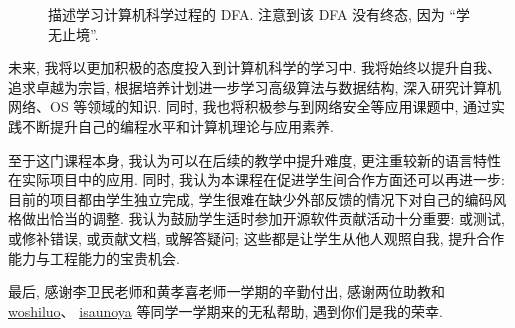 \begin{figure}[H]
    \centering
{}
\caption{描述学习计算机科学过程的 DFA. 注意到该 DFA 没有终态, 因为 “学无止境”.}
\label{fig_learning_process}
\end{figure}

未来, 我将以更加积极的态度投入到计算机科学的学习中. 我将始终以提升自我、 追求卓越为宗旨, 根据培养计划进一步学习高级算法与数据结构, 深入研究计算机网络、OS 等领域的知识. 同时, 我也将积极参与到网络安全等应用课题中, 通过实践不断提升自己的编程水平和计算机理论与应用素养.

至于这门课程本身, 我认为可以在后续的教学中提升难度, 更注重较新的语言特性在实际项目中的应用. 同时, 我认为本课程在促进学生间合作方面还可以再进一步: 目前的项目都由学生独立完成, 学生很难在缺少外部反馈的情况下对自己的编码风格做出恰当的调整. 我认为鼓励学生适时参加开源软件贡献活动十分重要: 或测试, 或修补错误, 或贡献文档, 或解答疑问; 这些都是让学生从他人观照自我, 提升合作能力与工程能力的宝贵机会.

最后, 感谢李卫民老师和黄孝喜老师一学期的辛勤付出, 感谢两位助教和 \href{https://github.com/woshiluo}{woshiluo}、 \href{https://github.com/isaunoya}{isaunoya} 等同学一学期来的无私帮助, 遇到你们是我的荣幸.
